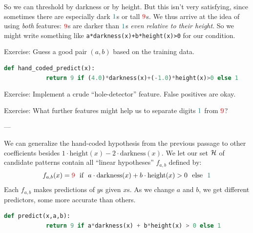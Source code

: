 \documentclass[11pt, justified]{tufte-book}
\newcommand{\attn}[1]{{\bro \textsf{#1}}}
\newcommand{\blarr}{\hspace{-0.15cm}${\bro \leftarrow}\,$}
\newcommand{\bcirc}{${\bro ^\circ}$}
\newcommand{\sampassage}[1]{
   \vspace{0.1cm}
   \par\noindent{\hspace{-2cm}\normalsize \sc \gre #1} ---
}
\theoremstyle{definition}
\begin{document}
        So we can threshold by darkness or by height.  But this isn't very
        satisfying, since sometimes there are especially dark ${\cya{1}}$s or
        tall ${\red{9}}$s. 
        We thus arrive at the idea of using \emph{both} features: ${\red{9}}$s
        are darker than ${\cya{1}}$s \emph{even relative to their
        height}.  So we might write something like
        \texttt{a*darkness(x)+b*height(x)>0} for
        our condition.
        \par\noindent
        \attn{Exercise:} {Guess a good pair $(a,b)$ based on the training data.}
        \begin{lstlisting}[language=Python, basicstyle=\footnotesize\ttfamily]
          def hand_coded_predict(x):
            return 9 if (4.0)*darkness(x)+(-1.0)*height(x)>0 else 1
        \end{lstlisting}
        \par\noindent
        \attn{Exercise:} {Implement a crude ``hole-detector'' feature.  False
        positives are okay.}
        \par\noindent
        \attn{Exercise:} {What further features might help us to separate digits
        ${\cya{1}}$ from ${\red{9}}$?}


    \newpage
      \sampassage{candidate patterns}
        We can generalize the hand-coded hypothesis from the previous passage
        to other coefficients besides $1\cdot \text{height}(x) -
        2\cdot\text{darkness}(x)$.  We let our set $\mathcal{H}$ of candidate patterns
        contain all ``linear hypotheses'' $f_{a,b}$ defined by:
        $$
          f_{a,b}(x) = {\red{9}} \text{~~if~~} a\cdot\text{darkness}(x) + b\cdot\text{height}(x) > 0 \text{~~else~~} {\cya{1}}
        $$ 
        Each $f_{a,b}$ makes predictions of $y$s given $x$s.  As we change $a$
        and $b$, we get different predictors, some more accurate than others.

        \begin{lstlisting}[language=Python, basicstyle=\footnotesize\ttfamily]
          def predict(x,a,b):
            return 9 if a*darkness(x) + b*height(x) > 0 else 1
        \end{lstlisting}
\end{document}
